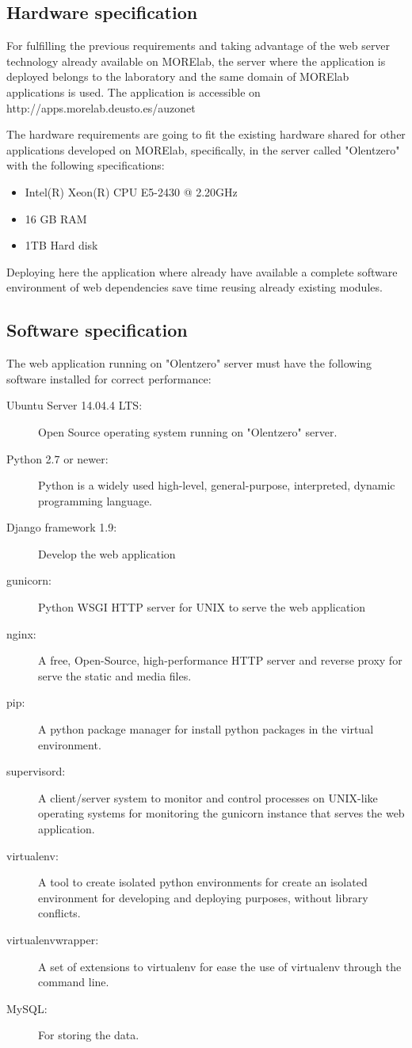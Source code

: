 \documentclass{DeustoFDP}
\begin{document}
\subsection{Hardware specification}
For fulfilling the previous requirements and taking advantage of the web server technology already available on MORElab, the server where the application is deployed belongs to the laboratory and the same domain of MORElab applications is used. The application is accessible on http://apps.morelab.deusto.es/auzonet

The hardware requirements are going to fit the existing hardware shared for other applications developed on MORElab, specifically, in the server called "Olentzero" with the following specifications:

\begin{itemize}
	\item Intel(R) Xeon(R) CPU E5-2430 @ 2.20GHz
	\item 16 GB RAM
	\item 1TB Hard disk
\end{itemize}

Deploying here the application where already have available a complete software environment of web dependencies save time reusing already existing modules.

\subsection{Software specification}
The web application running on "Olentzero" server must have the following software installed for correct performance:

\begin{description}
	\item[Ubuntu Server 14.04.4 LTS:] Open Source operating system running on "Olentzero" server.
	\item[Python 2.7 or newer:] Python is a widely used high-level, general-purpose, interpreted, dynamic programming language.
	\item[Django framework 1.9:] Develop the web application
	\item[gunicorn:] Python WSGI HTTP server for UNIX to serve the web application
	\item[nginx:] A free, Open-Source, high-performance HTTP server and reverse proxy for serve the static and media files.
	\item[pip:] A python package manager for install python packages in the virtual environment.
	\item[supervisord:] A client/server system to monitor and control processes on UNIX-like operating systems for monitoring the gunicorn instance that serves the web application.
	\item[virtualenv:] A tool to create isolated python environments for create an isolated environment for developing and deploying purposes, without library conflicts.
	\item[virtualenvwrapper:] A set of extensions to virtualenv for ease the use of virtualenv through the command line.
	\item[MySQL:] For storing the data.
\end{description}
\end{document}
